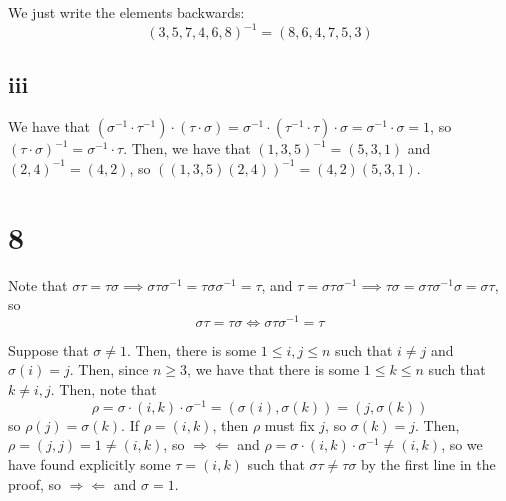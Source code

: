 \documentclass[12pt,letterpaper]{article}
\theoremstyle{definition}
\newcommand{\contra}{\Rightarrow\!\Leftarrow}
\begin{document}
We just write the elements backwards:
\[
  (3,5,7,4,6,8)^{-1} = (8,6,4,7,5,3)
\]

\subsection*{iii}

We have that $(\sigma^{-1} \cdot \tau^{-1})\cdot(\tau \cdot \sigma) = \sigma^{-1} \cdot (\tau^{-1} \cdot \tau) \cdot \sigma = \sigma^{-1} \cdot \sigma = 1$, so $(\tau \cdot \sigma)^{-1} = \sigma^{-1} \cdot \tau$. Then, we have that $(1,3,5)^{-1} = (5,3,1)$ and $(2,4)^{-1} = (4,2)$, so $((1,3,5)(2,4))^{-1} = (4,2)(5,3,1)$.

\section*{8}

Note that $\sigma \tau = \tau \sigma \implies \sigma \tau \sigma^{-1} = \tau \sigma \sigma^{-1} = \tau$, and $\tau = \sigma\tau\sigma^{-1} \implies \tau \sigma = \sigma \tau \sigma^{-1}\sigma = \sigma \tau$, so
\[
  \sigma \tau = \tau \sigma \iff \sigma \tau \sigma^{-1} = \tau
\]

Suppose that $\sigma \neq 1$. Then, there is some $1 \leq i,j \leq n$ such that $i \neq j$ and $\sigma(i) = j$. Then, since $n \geq 3$, we have that there is some $1 \leq k \leq n$ such that $k \neq i, j$. Then, note that
\[
  \rho = \sigma \cdot (i,k) \cdot \sigma^{-1} = (\sigma(i), \sigma(k)) = (j,\sigma(k))
\]
so $\rho(j) = \sigma(k)$. If $\rho = (i, k)$, then $\rho$ must fix $j$, so $\sigma(k) = j$. Then, $\rho = (j,j) = 1 \neq (i,k)$, so $\contra$ and $\rho = \sigma \cdot (i,k) \cdot \sigma^{-1} \neq (i,k)$, so we have found explicitly some $\tau = (i,k)$ such that $\sigma \tau \neq \tau \sigma$ by the first line in the proof, so $\contra$ and $\sigma = 1$.
\end{document}

